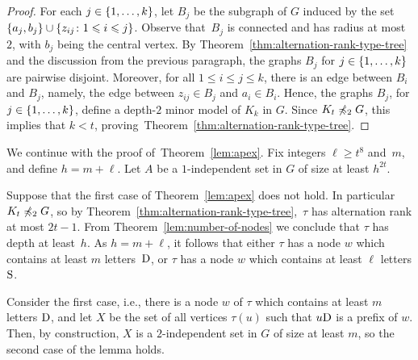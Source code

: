 \begin{proof}
For each $j\in\{1,\ldots,k\}$, let $B_j$
be the subgraph of $G$ induced by the set
$\{a_j,b_j\}\cup\{z_{ij}\colon 1\leqslant i\leqslant  j\}$.
Observe that~$B_j$ is connected and has radius at most $2$, with $b_j$ being the central vertex.
By Theorem~\ref{thm:alternation-rank-type-tree} and the discussion from the previous paragraph, the graphs $B_j$ for $j\in \{1,\ldots,k\}$
are pairwise disjoint.
Moreover, for all $1\le i\le j\le k$, there is an edge between $B_i$
and $B_j$, namely, the edge between $z_{ij}\in B_j$
and $a_i\in B_i$.
Hence, the graphs $B_j$, for $j\in \{1,\ldots,k\}$, define a depth-$2$ minor model of $K_k$ in $G$. Since $K_t\not\preccurlyeq_{2}G$, this implies that $k<t$, proving~Theorem~\ref{thm:alternation-rank-type-tree}.
\end{proof}

We continue with the proof of~Theorem~\ref{lem:apex}. 
Fix integers $\ell\ge t^8$ and~$m$, and define $h=m+\ell$.
Let $A$ be a $1$-independent set in $G$
of size at least $h^{2t}$.

Suppose that the first case of Theorem~\ref{lem:apex} does not hold. In particular $K_t\not\preccurlyeq_2 G$, so by Theorem~\ref{thm:alternation-rank-type-tree},~$\tau$ has alternation rank at most $2t-1$. From Theorem~\ref{lem:number-of-nodes} 
we conclude that $\tau$  has depth at least~$h$.
As $h=m+\ell$, it follows that either $\tau$  has a node $w$ which contains at least $m$ letters~$\mathrm{D}$, or $\tau$ has a node $w$ which contains  at least $\ell$ letters $\mathrm{S}$.

Consider the first case, i.e., there is a node $w$ of $\tau$
which contains at least $m$ letters $\mathrm{D}$, and let $X$
be the set of all vertices $\tau(u)$ such that $u\mathrm{D}$ is a prefix of $w$. Then, by construction, $X$ is a $2$-independent set in $G$ of size at least $m$, so the second case of the lemma holds.

